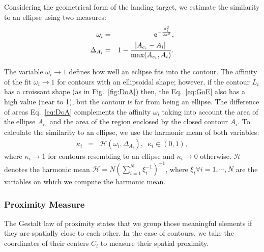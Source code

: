 Considering the geometrical form of the landing target, we estimate the similarity to an ellipse using two measures: 
\begin{eqnarray}
\omega_{i}&=&\mathsf{e}^{-\frac{d_{i}^{2}}{2\sigma^{2}}}, \label{eq:GoE}\\
\Delta_{A_{i}}&=& 1-\frac{\abs{ A_{e_{i}}-A_{i}}}{\max(A_{e_{i}},A_{i})}.\label{eq:DoA}
\end{eqnarray}

The variable $\omega_{i}\rightarrow 1$ defines how well an eclipse fits into the contour. The affinity of the fit $\omega_{i}\rightarrow 1$ for contours with an ellipsoidal shape; however, if the contour $L_{i}$ has a croissant shape (as in Fig.\ \ref{fig:DoA}) then, the Eq.\ \eqref{eq:GoE} also has a high value (near to 1), but the contour is far from being an ellipse. The difference of areas Eq.\ \eqref{eq:DoA} complements the affinity $\omega_{i}$ taking into account the area of the ellipse $A_{e_{i}}$ and the area of the region enclosed by the closed contour $A_{i}$. To calculate the similarity to an ellipse, we use the harmonic mean of both variables:
\begin{eqnarray}
\kappa_{i}&=&\mathcal{H}(\omega_{i}, \Delta_{A_{i}}), \enspace \kappa_{i}\in (0,1),\label{eq:similarity}
\end{eqnarray}
where $\kappa_{i}\rightarrow 1$ for contours resembling to an ellipse and $\kappa_{i}\rightarrow 0$ otherwise. $\mathcal{H}$ denotes the harmonic mean $\mathcal{H}= N \left(\sum\limits_{i=1}^{N} \xi_{i}^{-1} \right)^{-1}$, where $\xi_i \forall i = 1, \cdots, N$ are the variables on which we compute the harmonic mean.

\subsubsection{Proximity Measure}\label{subsec:proximity}
The Gestalt law of proximity states that we group those meaningful elements if they are spatially close to each other. In the case of contours, we take the coordinates of their centers $C_{i}$ to measure their spatial proximity.

